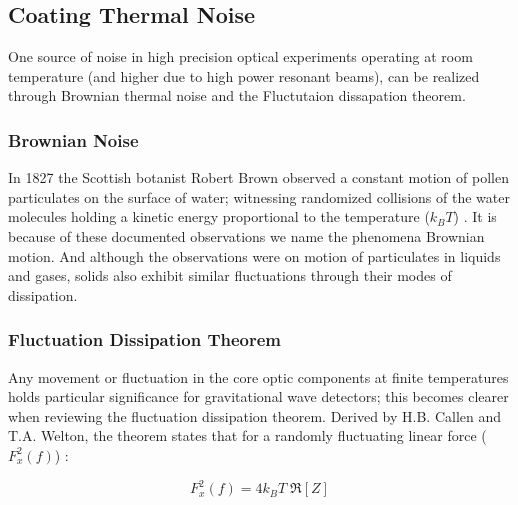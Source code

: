\subsection{Coating Thermal Noise}
One source of noise in high precision optical experiments operating at room temperature (and higher due to high power resonant beams), can be realized through Brownian thermal noise and the Fluctutaion dissapation theorem. 

\subsubsection*{Brownian Noise}
In 1827 the Scottish botanist Robert Brown observed a constant motion of pollen particulates on the surface of water; witnessing randomized collisions of the water molecules holding a kinetic energy proportional to the temperature ($k_BT$) \cite{brown:1828}. It is because of these documented observations we name the phenomena Brownian motion. And although the observations were on motion of particulates in liquids and gases, solids also exhibit similar fluctuations through their modes of dissipation. 

\subsubsection*{Fluctuation Dissipation Theorem}
Any movement or fluctuation in the core optic components at finite temperatures holds particular significance for gravitational wave detectors; this becomes clearer when reviewing the fluctuation dissipation theorem. Derived by H.B. Callen and T.A. Welton, the theorem states that for a randomly fluctuating linear force ($F_x^2(f)$) \cite{callen:1951}:


\begin{equation}
F_x^2(f) = 4 k_B T\; \Re[Z]
\end{equation}

